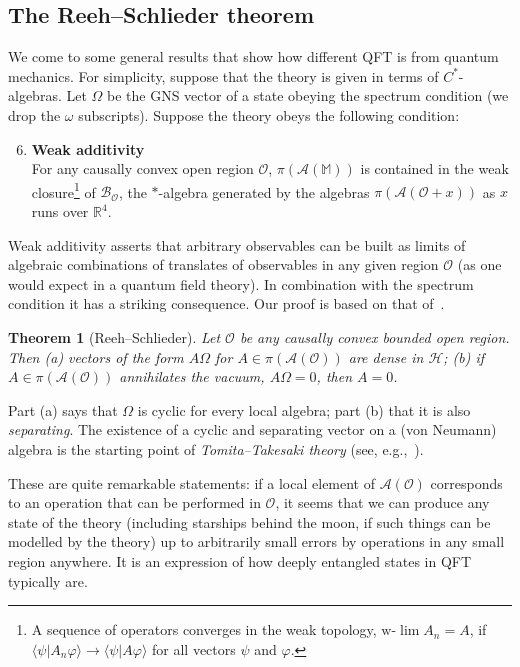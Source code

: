 \documentclass[12pt,a4paper]{article}
\newcommand{\1}{\mathds{1}}                         %
\newcommand{\RR}{\mathbb{R}}           %
\newcommand{\Ocal}{\mathcal{O}}
\newcommand{\MM}{\mathbb{M}}
\newcommand{\HH}{{\mathcal{H}}}
\newcommand{\Ac}{{\mathcal{A}}}
\newcommand{\Bc}{{\mathcal{B}}}
\newcommand{\ip}[2]{\langle #1|#2\rangle}
\newtheorem{theorem}{Theorem}%
\begin{document}
\subsection{The Reeh--Schlieder theorem} We come to some general results that show how different
QFT is from quantum mechanics. For simplicity, suppose that the theory is given in terms of $C^*$-algebras. Let $\Omega$ be the GNS vector of a state obeying the spectrum condition (we drop the $\omega$ subscripts). Suppose the theory obeys the following condition: 
\begin{enumerate}[label=\bf A\arabic{enumi},leftmargin=*,widest=4]\setcounter{enumi}{5}
	\item {\bf Weak additivity}\\
	For any causally convex open region $\Ocal$,  $\pi(\Ac(\MM))$ is contained in the weak closure\footnote{A sequence of operators converges in the weak topology, $\text{w-}\lim A_n = A$, if $\ip{\psi}{A_n\varphi}\to \ip{\psi}{A\varphi}$ for all vectors $\psi$ and $\varphi$.}  of $\Bc_\Ocal$, the $*$-algebra generated by the algebras $\pi(\Ac(\Ocal+x))$ as $x$ runs over $\RR^4$. 
\end{enumerate}
Weak additivity asserts that arbitrary observables can be built as limits of
algebraic combinations of translates of 
observables in any given region $\Ocal$ (as one would expect in a quantum field theory). In combination with
the spectrum condition it has a striking consequence. Our proof is based on that of~\cite{Araki}.

\begin{theorem}[Reeh--Schlieder] Let $\Ocal$ be any causally convex bounded open region. Then (a)
	vectors of the form $A\Omega$ for $A\in\pi(\Ac(\Ocal))$ are dense in $\HH$; (b) if $A\in\pi(\Ac(\Ocal))$ annihilates the vacuum, $A\Omega=0$, then $A=0$. 
\end{theorem}
Part (a) says that $\Omega$ is cyclic for every local algebra; part (b) that it is also \emph{separating}. The existence of a cyclic and separating vector on a (von Neumann) algebra is the starting point of \emph{Tomita--Takesaki theory} (see, e.g.,~\cite{BratRob:vol1}). 

These are quite remarkable statements: if a local element of $\Ac(\Ocal)$ corresponds to an operation that can be performed in $\Ocal$, it seems that we can produce any state of the theory (including starships behind the moon, if such things can be modelled by the theory) up to arbitrarily small errors by operations in any small region anywhere. It is an expression of how deeply entangled states in QFT typically are. 
\end{document}
